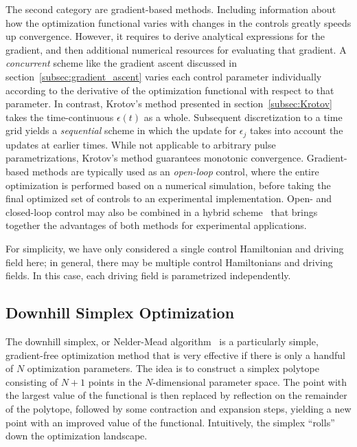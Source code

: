 The second category are gradient-based methods.
%
Including information about how the optimization functional varies with changes
in the controls greatly speeds up convergence. However, it requires to derive
analytical expressions for the gradient, and then additional numerical resources
for evaluating that gradient. A \emph{concurrent} scheme like the gradient
ascent discussed in section~\ref{subsec:gradient_ascent} varies each control
parameter individually according to the derivative of the optimization
functional with respect to that parameter. In contrast, Krotov's method
presented in section~\ref{subsec:Krotov} takes the time-continuous $\epsilon(t)$
as a whole. Subsequent discretization to a time grid yields a \emph{sequential}
scheme in which the update for $\epsilon_j$ takes into account the updates at
earlier times. While not applicable to arbitrary pulse
parametrizations, Krotov's method guarantees monotonic convergence.
Gradient-based methods are typically used as an \emph{open-loop} control, where
%
the entire optimization is performed based on a numerical simulation, before
taking the final optimized set of controls to an experimental implementation.
Open- and closed-loop control may also be combined in a hybrid
scheme~\cite{EggerPRL2014} that brings together the advantages of both methods
for experimental applications.

\enlargethispage{\baselineskip}
For simplicity, we have only considered a single control Hamiltonian and driving
field here; in general, there may be multiple control Hamiltonians and driving
fields.  In this case, each driving field is parametrized independently.

\subsection{Downhill Simplex Optimization}
\label{subsec:simplex}

The downhill simplex, or Nelder-Mead algorithm~\cite{NelderCJ1965} is a
%
particularly simple, gradient-free optimization method that is very effective
if there is only a handful of $N$ optimization parameters. The idea is to
construct a simplex polytope consisting of $N+1$ points in the $N$-dimensional
parameter space. The point with the largest value of the functional is then
replaced by reflection on the remainder of the polytope, followed by some
contraction and expansion steps, yielding a new point with an improved value of
the functional. Intuitively, the simplex ``rolls'' down the optimization
landscape.

